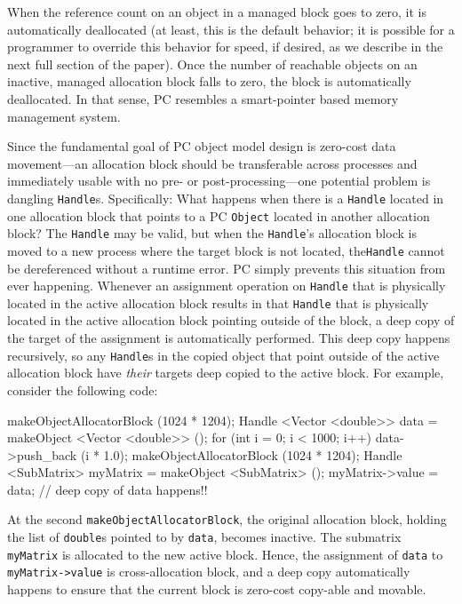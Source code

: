 When the reference count on an object in a managed block goes to zero, it is automatically
deallocated (at least, this is the default behavior; it is possible for a programmer to override this behavior for speed, if desired, as we describe in the
next full section of the paper).  
Once the number of reachable objects on an inactive, managed allocation block falls to zero, the block is automatically deallocated.  
In that sense, PC resembles a smart-pointer based memory management system.  

Since the fundamental goal of PC object model design is 
zero-cost data movement---an allocation block should be transferable across processes and immediately usable with no pre- or post-processing---one
potential problem is dangling \texttt{Handle}s.  Specifically: What happens when there is a \texttt{Handle} located in one allocation block that points to a PC
\texttt{Object} located in another allocation block?  The \texttt{Handle} may be valid, but when the \texttt{Handle}'s allocation block is moved to a new process where
the target block is not located, the\texttt{Handle} cannot be dereferenced without a runtime error. 
PC simply prevents this situation from ever happening. Whenever an assignment operation on \texttt{Handle} that is physically located
in the active allocation block results in that
\texttt{Handle} that is physically located in the active allocation block pointing outside of the block, a deep copy of the target of the assignment
is automatically performed.  This deep copy happens recursively, so any \texttt{Handle}s in the copied object that point outside of the active allocation block
have \emph{their} targets deep copied to the active block.  For example, consider the following code:

\begin{code}
makeObjectAllocatorBlock (1024 * 1204);
Handle <Vector <double>> data = makeObject <Vector <double>> ();
for (int i = 0; i < 1000; i++)
     data->push_back (i * 1.0);
makeObjectAllocatorBlock (1024 * 1204); 
Handle <SubMatrix> myMatrix = makeObject <SubMatrix> ();
myMatrix->value = data; // deep copy of data happens!!
\end{code}

At the second \texttt{makeObjectAllocatorBlock}, the original allocation block, holding the list of \texttt{double}s pointed to by \texttt{data}, becomes
inactive.  The submatrix \texttt{myMatrix} is allocated to the new active block.  
Hence, the assignment of \texttt{data} to \texttt{myMatrix->value} is cross-allocation block, and a deep copy automatically happens to ensure that
the current block is zero-cost copy-able and movable.  


